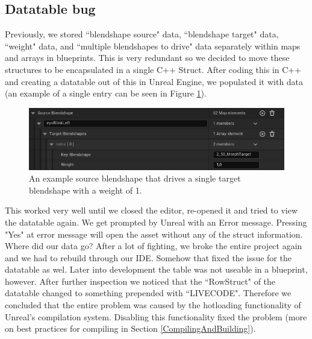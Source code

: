 \documentclass{uva-inf-article}
\begin{document}
\subsection{Datatable bug}\label{datatableBug}
Previously, we stored ``blendshape source" data, ``blendshape target" data, ``weight" data, and ``multiple blendshapes to drive" data separately within maps and arrays in blueprints. This is very redundant so we decided to move these structures to be encapsulated in a single C++ Struct. After coding this in C++ and creating a datatable out of this in Unreal Engine, we populated it with data (an example of a single entry can be seen in Figure \ref{fig:blendshapeStructExample}).

\begin{figure}[hbt!]
    \centering
    \includegraphics[width=\textwidth]{imgs/singleBlendshapeData.png}
    \caption{An example source blendshape that drives a single target blendshape with a weight of 1.}
    \label{fig:blendshapeStructExample}
\end{figure}

This worked very well until we closed the editor, re-opened it and tried to view the datatable again. We get prompted by Unreal with an Error message. Pressing "Yes" at error message will open the asset without any of the struct information. Where did our data go? After a lot of fighting, we broke the entire project again and we had to rebuild through our IDE. Somehow that fixed the issue for the datatable as wel. Later into development the table was not useable in a blueprint, however. After further inspection we noticed that the ``RowStruct" of the datatable changed to something prepended with ``LIVECODE". Therefore we concluded that the entire problem was caused by the hotloading functionality of Unreal's compilation system. Disabling this functionality fixed the problem (more on best practices for compiling in Section \ref{CompilingAndBuilding}).



\printbibliography



\end{document}
